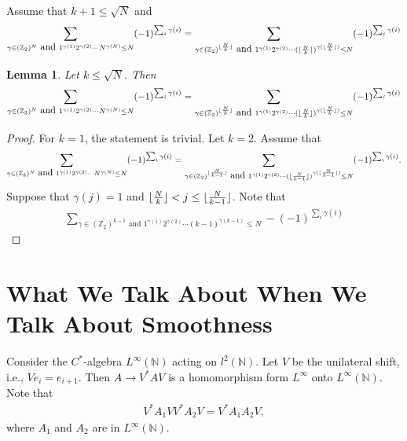\documentclass[a4paper,10pt]{amsart}
\newtheorem{lemma}{Lemma}[section]
\newcommand{\Z}{\mathbb Z} %
\newcommand{\N}{\mathbb N} %
\DeclarePairedDelimiter\floor{\lfloor}{\rfloor}
\begin{document}
Assume that $k + 1 \leq \sqrt{N}$ and 
\begin{align*}
    \sum_{\gamma \in (\Z_{2})^{N} \mbox{ and } 
    1^{\gamma(1)}2^{\gamma(2)}\cdots N^{\gamma(N)} \leq N} 
    (-1)^{\sum_{i}\gamma(i)} 
    = \sum_{\gamma \in (\Z_{2})^{\floor{\frac{N}{k}}} \mbox{ and } 
    1^{\gamma(1)}2^{\gamma(2)}\cdots 
    (\floor{\frac{N}{k}})^{\gamma(\floor{\frac{N}{k}})} \leq N} 
    (-1)^{\sum_{i}\gamma(i)}
\end{align*}

\begin{lemma}
    Let $k \leq \sqrt{N}$. Then
    \begin{align*}
    \sum_{\gamma \in (\Z_{2})^{N} \mbox{ and } 
    1^{\gamma(1)}2^{\gamma(2)}\cdots N^{\gamma(N)} \leq N} 
    (-1)^{\sum_{i}\gamma(i)} 
    = \sum_{\gamma \in (\Z_{2})^{\floor{\frac{N}{k}}} \mbox{ and } 
    1^{\gamma(1)}2^{\gamma(2)}\cdots 
    (\floor{\frac{N}{k}})^{\gamma(\floor{\frac{N}{k}})} \leq N} 
    (-1)^{\sum_{i}\gamma(i)}
\end{align*}
\end{lemma}

\begin{proof}
   For $k = 1$, the statement is trivial. Let $k = 2$. 
       Assume that
    \begin{align*}
    \sum_{\gamma \in (\Z_{2})^{N} \mbox{ and } 
    1^{\gamma(1)}2^{\gamma(2)}\cdots N^{\gamma(N)} \leq N} 
    (-1)^{\sum_{i}\gamma(i)} 
    = \sum_{\gamma \in (\Z_{2})^{\floor{\frac{N}{k-1}}} \mbox{ and } 
    1^{\gamma(1)}2^{\gamma(2)}\cdots 
    (\floor{\frac{N}{k-1}})^{\gamma(\floor{\frac{N}{k-1}})} \leq N} 
    (-1)^{\sum_{i}\gamma(i)}.
\end{align*}
Suppose that $\gamma(j) = 1$ and 
$\floor{\frac{N}{k}} < j \leq \floor{\frac{N}{k-1}}$.
Note that
\begin{align*}
    \sum_{\gamma \in (\Z_{2})^{k-1} \mbox{ and } 
    1^{\gamma(1)}2^{\gamma(2)}\cdots (k-1)^{\gamma(k-1)} \leq N} 
    -(-1)^{\sum_{i}\gamma(i)} 
\end{align*}

\end{proof}

\section{What We Talk About When We Talk About Smoothness} 

Consider the $C^{*}$-algebra $L^{\infty}(\N)$ acting on $l^{2}(\N)$.
Let $V$ be the unilateral shift, i.e., $V e_{i} = e_{i+1}$.
Then $A \rightarrow V^{*}AV$ is a homomorphism form $L^{\infty}$ onto
$L^{\infty}(\N)$.
Note that 
\begin{align*}
    V^{*}A_{1}VV^{*}A_{2}V = V^{*}A_{1}A_{2}V,
\end{align*}
where $A_1$ and $A_2$ are in $L^{\infty}(\N)$.
\end{document}
